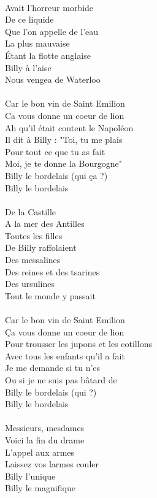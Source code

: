 \\Avait l'horreur morbide
\\De ce liquide
\\Que l'on appelle de l'eau
\\La plus mauvaise
\\Étant la flotte anglaise
\\Billy à l'aise
\\Nous vengea de Waterloo
\\\\Car le bon vin de Saint Emilion
\\Ca vous donne un coeur de lion
\\Ah qu'il était content le Napoléon
\\Il dit à Billy : "Toi, tu me plais
\\Pour tout ce que tu as fait
\\Moi, je te donne la Bourgogne"
\\Billy le bordelais (qui ça ?)
\\Billy le bordelais
\\\\De la Castille
\\A la mer des Antilles
\\Toutes les filles
\\De Billy raffolaient
\\Des messalines
\\Des reines et des tsarines
\\Des ursulines
\\Tout le monde y passait
\\\\Car le bon vin de Saint Emilion
\\Ça vous donne un coeur de lion
\\Pour trousser les jupons et les cotillons
\\Avec tous les enfants qu'il a fait
\\Je me demande si tu n'es
\\Ou si je ne suis pas bâtard de
\\Billy le bordelais (qui ?)
\\Billy le bordelais
\\\\Messieurs, mesdames
\\Voici la fin du drame
\\L'appel aux armes
\\Laissez vos larmes couler
\\Billy l'unique
\\Billy le magnifique
